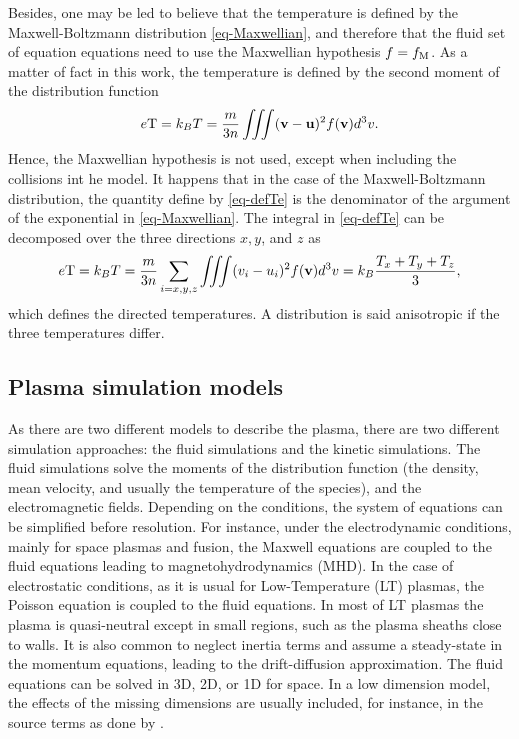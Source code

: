 Besides, one may be led to believe that the temperature is defined by the Maxwell-Boltzmann distribution \cref{eq-Maxwellian}, and therefore that the fluid set of equation equations need to use the Maxwellian hypothesis $f = f_{\rm M}$.
As a matter of fact in this work, the temperature is defined by the second moment of the distribution function
\begin{equation} \label{eq-defTe}
  e {\rm T} = k_B T = \frac{m}{3 n} \iiint ({\mathbf v} - {\mathbf u})^2 f({\mathbf v}) d^3v.
\end{equation}
Hence, the Maxwellian hypothesis is not used, except when including the collisions int he model.
It happens that in the case of the Maxwell-Boltzmann distribution, the quantity define by \cref{eq-defTe} is the denominator of the argument of the exponential in \cref{eq-Maxwellian}.
The integral in \cref{eq-defTe} can be decomposed over the three directions $x,y$, and $z$ as
\begin{equation} \label{eq-3Te}
  e {\rm T} = k_B T = \frac{m}{3 n} \sum_{i=x,y,z} \iiint (v_i - u_i)^2 f({\mathbf v}) d^3v = k_B \frac{ T_x + T_y + T_z}{3},
\end{equation}
which defines the directed temperatures.
A distribution is said anisotropic if the three temperatures differ.

\subsection{Plasma simulation models} \label{subsec-simulations}
As there are two different models to describe the plasma, there are two different simulation approaches\string: the fluid simulations and the kinetic simulations.
The fluid simulations solve the moments of the distribution function (the density, mean velocity, and usually the temperature of the species), and the electromagnetic fields.
Depending on the conditions, the system of equations can be simplified before resolution.
For instance, under the electrodynamic conditions, mainly for space plasmas and fusion, the Maxwell equations are coupled to the fluid equations leading to magnetohydrodynamics (MHD).
In the case of electrostatic conditions, as it is usual for Low-Temperature (LT) plasmas, the Poisson equation is coupled to the fluid equations.
In most of LT plasmas the plasma is quasi-neutral except in small regions, such as the plasma sheaths close to walls.
It is also common to neglect inertia terms and assume a steady-state in the momentum equations, leading to the drift-diffusion approximation.
The fluid equations can be solved in \ac{3D}, \ac{2D}, or \ac{1D} for space.
In a low dimension model, the effects of the missing dimensions are usually included, for instance, in the source terms as done by \citet{barral2003a}.


